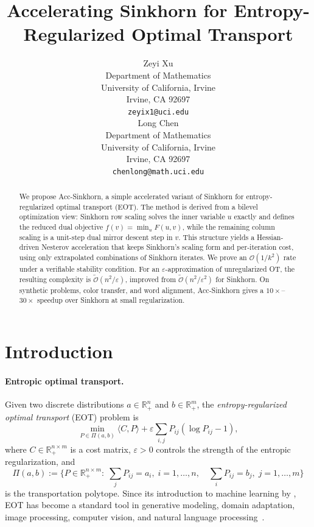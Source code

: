\documentclass{article}
\title{Accelerating Sinkhorn for Entropy-Regularized Optimal Transport}
\author{%
  Zeyi Xu \\
  Department of Mathematics\\
  University of California, Irvine\\
  Irvine, CA 92697 \\
  \texttt{zeyix1@uci.edu} \\
 \And
 Long Chen \\
 Department of Mathematics\\
  University of California, Irvine\\
  Irvine, CA 92697 \\
  \texttt{chenlong@math.uci.edu} \\
}
\theoremstyle{plain}
\theoremstyle{remark}
\begin{document}
\maketitle

\begin{abstract}
We propose Acc-Sinkhorn, a simple accelerated variant of Sinkhorn for entropy-regularized optimal transport (EOT). The method is derived from a bilevel optimization view: Sinkhorn row scaling solves the inner variable $u$ exactly and defines the reduced dual objective $f(v)=\min_u F(u,v)$, while the remaining column scaling is a unit-step dual mirror descent step in $v$. This structure yields a Hessian-driven Nesterov acceleration that keeps Sinkhorn's scaling form and per-iteration cost, using only extrapolated combinations of Sinkhorn iterates. We prove an $\mathcal{O}(1/k^2)$ rate under a verifiable stability condition. For an $\varepsilon$-approximation of unregularized OT, the resulting complexity is $\widetilde{\mathcal{O}}(n^2/\varepsilon)$, improved from $\widetilde{\mathcal{O}}(n^2/\varepsilon^2)$ for Sinkhorn. On synthetic problems, color transfer, and word alignment, Acc-Sinkhorn gives a $10\times$--$30\times$ speedup over Sinkhorn at small regularization.
\end{abstract}

\section{Introduction}

\paragraph{Entropic optimal transport.}
Given two discrete distributions $a \in \mathbb{R}^n_+$ and $b \in \mathbb{R}^m_+$, the \emph{entropy-regularized optimal transport} (EOT) problem is
\begin{equation}\label{eq:EOT}
\min_{P \in \Pi(a,b)} \langle C, P \rangle + \varepsilon \sum_{i,j} P_{ij}(\log P_{ij}-1),
\end{equation}
where $C \in \mathbb{R}^{n \times m}_+$ is a cost matrix, $\varepsilon>0$ controls the strength of the entropic regularization, and
$$
\Pi(a,b):=\Big \{P\in\mathbb{R}^{n\times m}_+:\; \sum_{j} P_{ij}=a_i,\; i=1,\ldots,n,\quad \sum_{i} P_{ij}=b_j,\; j=1,\ldots,m\Big \}
$$
is the transportation polytope. 
Since its introduction to machine learning by \citet{cuturi2013sinkhorn}, EOT has become a standard tool in generative modeling, domain adaptation, image processing, computer vision, and natural language processing~\citep{genevay2018learning,courty2017joint,solomon2015convolutional,xu2019learning,alvarez2020unsupervised}.
\end{document}
